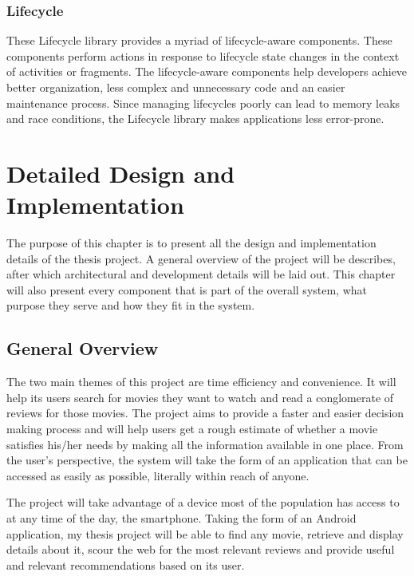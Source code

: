 \documentclass[12pt,a4paper,twoside]{report}
\begin{document}
\subsection{Lifecycle}
These Lifecycle library provides a myriad of lifecycle-aware components. These components perform actions in response to lifecycle state changes in the context of activities or fragments. The lifecycle-aware components help developers achieve better organization, less complex and unnecessary code and an easier maintenance process. Since managing lifecycles poorly can lead to memory leaks and race conditions, the Lifecycle library makes applications less error-prone.

\chapter{Detailed Design and Implementation}

The purpose of this chapter is to present all the design and implementation details of the thesis project. A general overview of the project will be describes, after which architectural and development details will be laid out. This chapter will also present every component that is part of the overall system, what purpose they serve and how they fit in the system.

\section{General Overview}
The two main themes of this project are time efficiency and convenience. It will help its users search for movies they want to watch and read a conglomerate of reviews for those movies. The project aims to provide a faster and easier decision making process and will help users get a rough estimate of whether a movie satisfies his/her needs by making all the information available in one place. From the user's perspective, the system will take the form of an application that can be accessed as easily as possible, literally within reach of anyone.

The project will take advantage of a device most of the population has access to at any time of the day, the smartphone. Taking the form of an Android application, my thesis project will be able to find any movie, retrieve and display details about it, scour the web for the most relevant reviews and provide useful and relevant recommendations based on its user.
\end{document}
